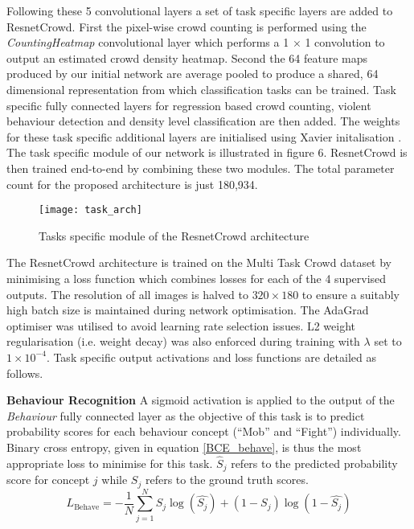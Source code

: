 \documentclass[10pt,twocolumn,letterpaper]{article}
\begin{document}
Following these 5 convolutional layers a set of task specific layers are added to ResnetCrowd. First the pixel-wise crowd counting is performed using the  \textit{CountingHeatmap} convolutional layer which performs a 1 $\times$ 1 convolution to output an estimated crowd density heatmap. Second the 64 feature maps produced by our initial network are average pooled to produce a shared, 64 dimensional representation from which classification tasks can be trained. Task specific fully connected layers for regression based crowd counting, violent behaviour detection and density level classification are then added. The weights for these task specific additional layers are initialised using Xavier initalisation \cite{glorot2010understanding}.  The task specific module of our network is illustrated in figure 6. ResnetCrowd is then trained end-to-end by combining these two modules. The total parameter count for the proposed architecture is just 180,934.


\begin{figure}[h!]
	\centering
	\texttt{[image: task\_arch]}   
	\label{task_arch}
    \caption{Tasks specific module of the ResnetCrowd architecture}
\end{figure}



The ResnetCrowd architecture is trained on the Multi Task Crowd dataset by minimising a loss function which combines losses for each of the 4 supervised outputs. The resolution of all images is halved to $320 \times 180$ to ensure a suitably high batch size is maintained during network optimisation. The AdaGrad optimiser \cite{duchi2011adaptive} was utilised to avoid learning rate selection issues. L2 weight regularisation (i.e. weight decay) was also enforced during training with $\lambda$ set to $1 \times 10^{-4}$. Task specific output activations and loss functions are detailed as follows. 

\textbf{Behaviour Recognition} A sigmoid activation is applied to the output of the \textit{Behaviour} fully connected layer as the objective of this task is to predict probability scores for each behaviour concept (``Mob'' and ``Fight'') individually. Binary cross entropy, given in equation \ref{BCE_behave}, is thus the most appropriate loss to minimise for this task. $\hat{S}_j$ refers to the predicted probability score for concept $j$ while $S_j$ refers to the ground truth scores.
%
\begin{equation}
L_{\text{Behave}}=-\frac{1}{N}\sum_{j=1}^{N}S_{j}\log(\hat{S_{j}})+(1-S_{j})\log(1-\hat{S_{j}})
\label{BCE_behave}
\end{equation}
\end{document}

